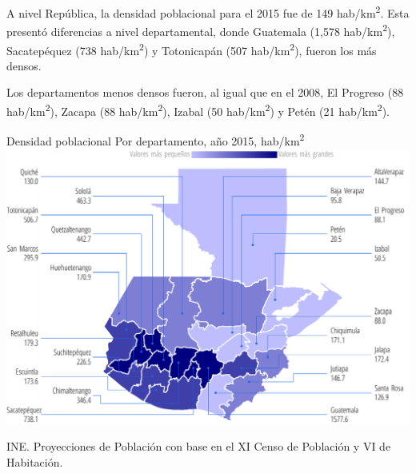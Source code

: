 %
{%
	A nivel República, la densidad poblacional para el 2015 fue de 149 hab/km\textsuperscript2.
	Esta presentó diferencias a nivel departamental, donde Guatemala (1,578 hab/km\textsuperscript2), Sacatepéquez (738 hab/km\textsuperscript2) y Totonicapán (507 hab/km\textsuperscript2), fueron los más densos.
	
	Los departamentos menos densos fueron, al igual que en el 2008, El Progreso (88 hab/km\textsuperscript2), Zacapa (88 hab/km\textsuperscript2), Izabal (50 hab/km\textsuperscript2) y Petén (21 hab/km\textsuperscript2).
}%
{%
	Densidad poblacional
} %
{%
	Por departamento, año 2015, hab/km\textsuperscript2} %
{%
	\includegraphics[width=52\cuadri]{graficas/1_06.pdf}}%
{%
	
	INE. Proyecciones de Población con base en el XI Censo de Población y VI de Habitación.} %





